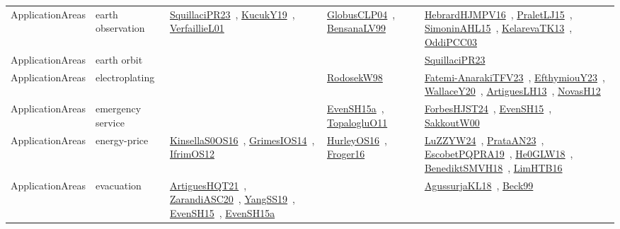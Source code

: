 {\begin{longtable}{lp{3cm}>{\raggedright\arraybackslash}p{6cm}>{\raggedright\arraybackslash}p{6cm}>{\raggedright\arraybackslash}p{8cm}}
ApplicationAreas & earth observation & \href{../works/SquillaciPR23.pdf}{SquillaciPR23}~\cite{SquillaciPR23}, \href{../works/KucukY19.pdf}{KucukY19}~\cite{KucukY19}, \href{../works/VerfaillieL01.pdf}{VerfaillieL01}~\cite{VerfaillieL01} & \href{../works/GlobusCLP04.pdf}{GlobusCLP04}~\cite{GlobusCLP04}, \href{../works/BensanaLV99.pdf}{BensanaLV99}~\cite{BensanaLV99} & \href{../works/HebrardHJMPV16.pdf}{HebrardHJMPV16}~\cite{HebrardHJMPV16}, \href{../works/PraletLJ15.pdf}{PraletLJ15}~\cite{PraletLJ15}, \href{../works/SimoninAHL15.pdf}{SimoninAHL15}~\cite{SimoninAHL15}, \href{../works/KelarevaTK13.pdf}{KelarevaTK13}~\cite{KelarevaTK13}, \href{../works/OddiPCC03.pdf}{OddiPCC03}~\cite{OddiPCC03}\\
ApplicationAreas & earth orbit &  &  & \href{../works/SquillaciPR23.pdf}{SquillaciPR23}~\cite{SquillaciPR23}\\
ApplicationAreas & electroplating &  & \href{../works/RodosekW98.pdf}{RodosekW98}~\cite{RodosekW98} & \href{../works/Fatemi-AnarakiTFV23.pdf}{Fatemi-AnarakiTFV23}~\cite{Fatemi-AnarakiTFV23}, \href{../works/EfthymiouY23.pdf}{EfthymiouY23}~\cite{EfthymiouY23}, \href{../works/WallaceY20.pdf}{WallaceY20}~\cite{WallaceY20}, \href{../works/ArtiguesLH13.pdf}{ArtiguesLH13}~\cite{ArtiguesLH13}, \href{../works/NovasH12.pdf}{NovasH12}~\cite{NovasH12}\\
ApplicationAreas & emergency service &  & \href{../works/EvenSH15a.pdf}{EvenSH15a}~\cite{EvenSH15a}, \href{../works/TopalogluO11.pdf}{TopalogluO11}~\cite{TopalogluO11} & \href{../works/ForbesHJST24.pdf}{ForbesHJST24}~\cite{ForbesHJST24}, \href{../works/EvenSH15.pdf}{EvenSH15}~\cite{EvenSH15}, \href{../works/SakkoutW00.pdf}{SakkoutW00}~\cite{SakkoutW00}\\
ApplicationAreas & energy-price & \href{../works/KinsellaS0OS16.pdf}{KinsellaS0OS16}~\cite{KinsellaS0OS16}, \href{../works/GrimesIOS14.pdf}{GrimesIOS14}~\cite{GrimesIOS14}, \href{../works/IfrimOS12.pdf}{IfrimOS12}~\cite{IfrimOS12} & \href{../works/HurleyOS16.pdf}{HurleyOS16}~\cite{HurleyOS16}, \href{../works/Froger16.pdf}{Froger16}~\cite{Froger16} & \href{../works/LuZZYW24.pdf}{LuZZYW24}~\cite{LuZZYW24}, \href{../works/PrataAN23.pdf}{PrataAN23}~\cite{PrataAN23}, \href{../works/EscobetPQPRA19.pdf}{EscobetPQPRA19}~\cite{EscobetPQPRA19}, \href{../works/He0GLW18.pdf}{He0GLW18}~\cite{He0GLW18}, \href{../works/BenediktSMVH18.pdf}{BenediktSMVH18}~\cite{BenediktSMVH18}, \href{../works/LimHTB16.pdf}{LimHTB16}~\cite{LimHTB16}\\
ApplicationAreas & evacuation & \href{../works/ArtiguesHQT21.pdf}{ArtiguesHQT21}~\cite{ArtiguesHQT21}, \href{../works/ZarandiASC20.pdf}{ZarandiASC20}~\cite{ZarandiASC20}, \href{../works/YangSS19.pdf}{YangSS19}~\cite{YangSS19}, \href{../works/EvenSH15.pdf}{EvenSH15}~\cite{EvenSH15}, \href{../works/EvenSH15a.pdf}{EvenSH15a}~\cite{EvenSH15a} &  & \href{../works/AgussurjaKL18.pdf}{AgussurjaKL18}~\cite{AgussurjaKL18}, \href{../works/Beck99.pdf}{Beck99}~\cite{Beck99}\\

\end{longtable}}
